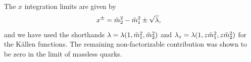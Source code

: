The $x$ integration limits are given by
\begin{equation}
    x^\pm = \tilde{m}_2^2 - \tilde{m}_1^2 \pm \sqrt{\lambda},
\end{equation}
and we have used the shorthands $\lambda=\lambda(1,\tilde{m}_1^2,\tilde{m}_2^2)$ and $\lambda_z=\lambda(1,z\tilde{m}_1^2,z\tilde{m}_2^2)$ for the K\"allen functions.
The remaining non-factorizable contribution was shown to be zero in the limit of massless quarks.